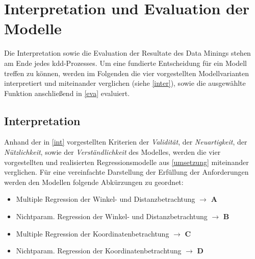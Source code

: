 \section{Interpretation und Evaluation der Modelle}
\label{iue}
Die Interpretation sowie die Evaluation der Resultate des Data Minings stehen am Ende jedes \gls{kdd}-Prozesses. Um eine fundierte Entscheidung für ein Modell treffen zu können, werden im Folgenden die vier vorgestellten Modellvarianten interpretiert und miteinander verglichen (siehe \vref{inter}), sowie die ausgewählte Funktion anschließend in \vref{eva} evaluiert.

\subsection{Interpretation}
\label{inter}
Anhand der in \vref{int} vorgestellten Kriterien der \textit{Validität}, der \textit{Neuartigkeit}, der \textit{Nützlichkeit}, sowie der \textit{Verständlichkeit} des Modelles, werden die vier vorgestellten und realisierten Regressionsmodelle aus \vref{umsetzung} miteinander verglichen. Für eine vereinfachte Darstellung der Erfüllung der Anforderungen werden den Modellen folgende Abkürzungen zu geordnet:

\begin{itemize}
\item Multiple Regression der Winkel- und Distanzbetrachtung $\rightarrow$ \textbf{A}
\item Nichtparam. Regression der Winkel- und Distanzbetrachtung $\rightarrow$ \textbf{B}
\item Multiple Regression der Koordinatenbetrachtung $\rightarrow$ \textbf{C}
\item Nichtparam. Regression der Koordinatenbetrachtung $\rightarrow$ \textbf{D}
\end{itemize}

